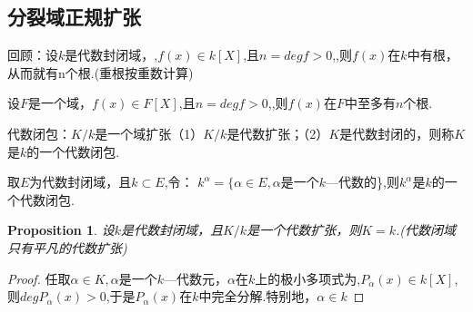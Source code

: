\documentclass[UTF8]{article}
\newtheorem{prop}{Proposition}[section]
\begin{document}
\subsection{分裂域\quad 正规扩张}
\normalsize

回顾：设$k$是代数封闭域，,$f(x)\in k[X]$,且$n=degf>0$,,则$f(x)$在$k$中有根，从而就有n个根.(重根按重数计算)

设$F$是一个域，$f(x)\in F[X]$,且$n=degf>0$,,则$f(x)$在$F$中至多有$n$个根.


代数闭包：$K/k$是一个域扩张（1）$K/k$是代数扩张；（2）$K$是代数封闭的，则称$K$是$k$的一个代数闭包.

取$E$为代数封闭域，且$k\subset E$,令：
$k^{\alpha}=\{\alpha \in E,\alpha$是一个$k$—代数的\},则$k^{\alpha}$是$k$的一个代数闭包.

\begin{prop}
	设$k$是代数封闭域，且$K/k$是一个代数扩张，则$K=k$.(代数闭域只有平凡的代数扩张)
\end{prop}
\begin{proof}
任取$\alpha \in K,\alpha$是一个$k$—代数元，$\alpha $在$k$上的极小多项式为,$P_{\alpha}(x)\in k[X]$,则$degP_{\alpha}(x)>0$,于是$P_{\alpha}(x)$在$k$中完全分解.特别地，$\alpha \in k$
\end{proof}
\end{document}

